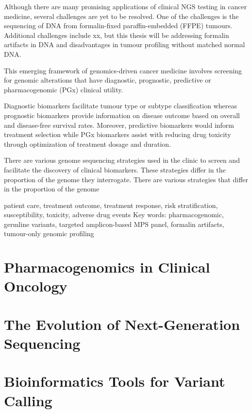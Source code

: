 Although there are many promising applications of clinical NGS testing in cancer medicine, several challenges are yet to be resolved. One of the challenges is the sequencing of DNA from formalin-fixed paraffin-embedded (FFPE) tumours. Additional challenges include xx, but this thesis will be addressing formalin artifacts in DNA and disadvantages in tumour profiling without matched normal DNA.

This emerging framework of genomics-driven cancer medicine involves screening for genomic alterations that have diagnostic, prognostic, predictive or pharmacogenomic (PGx) clinical utility.

 Diagnostic biomarkers facilitate tumour type or subtype classification whereas prognostic biomarkers provide information on disease outcome based on overall and disease-free survival rates. Moreover, predictive biomarkers would inform treatment selection while PGx biomarkers assist with reducing drug toxicity through optimization of treatment dosage and duration.

There are various genome sequencing strategies used in the clinic to screen and facilitate the discovery of clinical biomarkers. These strategies differ in the proportion of the genome they interrogate. There are various strategies that differ in the proportion of the genome

patient care, treatment outcome, treatment response, risk stratification, susceptibility, toxicity, adverse drug events
Key words: pharmacogenomic, germline variants, targeted amplicon-based MPS panel, formalin artifacts, tumour-only genomic profiling

\section{Pharmacogenomics in Clinical Oncology}
\label{sec:PharmacogenomicsinClinicalOncology}



\section{The Evolution of Next-Generation Sequencing}
\label{sec:TheEvolutionofNext-GenerationSequencing}



\section{Bioinformatics Tools for Variant Calling}
\label{sec:BioinformaticsToolsforVariantCalling}

